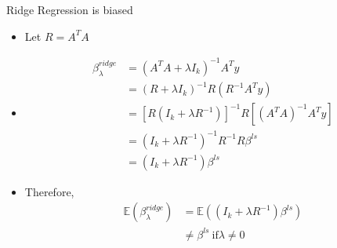\documentclass{beamer}
\begin{document}
\begin{frame}{Ridge Regression is biased}
    \begin{itemize}
        \item Let $R = A^T A$
        \item \begin{equation}
                \begin{split}
                    \beta_{\lambda}^{ridge} &= (A^TA + \lambda I_k)^{-1} A^Ty \\
                    &= (R + \lambda I_k)^{-1}R(R^{-1}A^Ty) \\
                    &= [R(I_k + \lambda R^{-1})]^{-1} R [(A^TA)^{-1} A^T y] \\
                    &= (I_k + \lambda R^{-1})^{-1} R^{-1} R \beta^{ls} \\
                    &= (I_k + \lambda R^{-1}) \beta^{ls}
                \end{split}
            \end{equation}
        \item Therefore, 
            \begin{equation}
                \begin{split}
                    \mathbb E(\beta_{\lambda}^{ridge}) &= \mathbb E((I_k + \lambda R^{-1})\beta^{ls}) \\
                    &\neq \beta^{ls} ~ \text{if} \lambda \neq 0
                \end{split}
            \end{equation}


    \end{itemize}
\end{frame}
\end{document}
